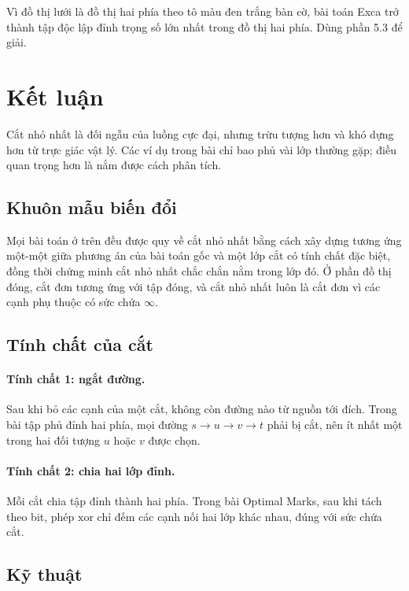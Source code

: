 \documentclass[11pt]{article}
\newcommand{\INF}{\infty}
\newcommand{\xor}{\mathbin{\mathrm{xor}}}
\begin{document}
Vì đồ thị lưới là đồ thị hai phía theo tô màu đen trắng bàn cờ, bài toán Exca
trở thành tập độc lập đỉnh trọng số lớn nhất trong đồ thị hai phía. Dùng phần
5.3 để giải.

\section{Kết luận}

Cắt nhỏ nhất là đối ngẫu của luồng cực đại, nhưng trừu tượng hơn và khó dựng
hơn từ trực giác vật lý. Các ví dụ trong bài chỉ bao phủ vài lớp thường gặp;
điều quan trọng hơn là nắm được cách phân tích.

\subsection{Khuôn mẫu biến đổi}

Mọi bài toán ở trên đều được quy về cắt nhỏ nhất bằng cách xây dựng tương ứng
một-một giữa phương án của bài toán gốc và một lớp cắt có tính chất đặc biệt,
đồng thời chứng minh cắt nhỏ nhất chắc chắn nằm trong lớp đó. Ở phần đồ thị
đóng, cắt đơn tương ứng với tập đóng, và cắt nhỏ nhất luôn là cắt đơn vì các
cạnh phụ thuộc có sức chứa \(\INF\).

\subsection{Tính chất của cắt}

\paragraph{Tính chất 1: ngắt đường.}
Sau khi bỏ các cạnh của một cắt, không còn đường nào từ nguồn tới đích. Trong
bài tập phủ đỉnh hai phía, mọi đường \(s\to u\to v\to t\) phải bị cắt, nên
ít nhất một trong hai đối tượng \(u\) hoặc \(v\) được chọn.

\paragraph{Tính chất 2: chia hai lớp đỉnh.}
Mỗi cắt chia tập đỉnh thành hai phía. Trong bài Optimal Marks, sau khi tách
theo bit, phép \(\xor\) chỉ đếm các cạnh nối hai lớp khác nhau, đúng với sức
chứa cắt.

\subsection{Kỹ thuật}
\end{document}
